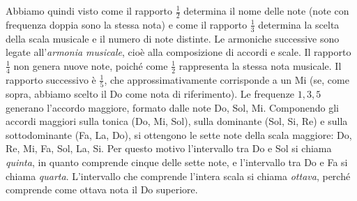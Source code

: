 Abbiamo quindi visto come il rapporto $\frac 1 2$ determina il nome
delle note (note con frequenza doppia sono la stessa nota) e come il rapporto 
$\frac 1 3$ determina la scelta della scala musicale e il numero di note distinte.
Le armoniche successive sono legate all’\emph{armonia musicale}, 
cioè alla composizione di accordi e scale. 
Il rapporto $\frac 1 4$ non genera nuove note, poiché come $\frac 1 2$ 
rappresenta la stessa nota musicale. 
Il rapporto successivo è $\frac 1 5$, che approssimativamente corrisponde a un Mi 
(se, come sopra, abbiamo scelto il Do come nota di riferimento). 
Le frequenze $1,3,5$ generano l’accordo maggiore, formato dalle note Do, Sol, Mi. 
Componendo gli accordi maggiori sulla tonica (Do, Mi, Sol), 
sulla dominante (Sol, Si, Re) e sulla sottodominante (Fa, La, Do), 
si ottengono le sette note della scala maggiore: Do, Re, Mi, Fa, Sol, La, Si.
Per questo motivo l’intervallo tra Do e Sol si chiama \emph{quinta}, 
in quanto comprende cinque delle sette note, e l’intervallo tra Do e Fa 
si chiama \emph{quarta}. 
L’intervallo che comprende l’intera scala si chiama \emph{ottava}, 
perché comprende come ottava nota il Do superiore.

%






